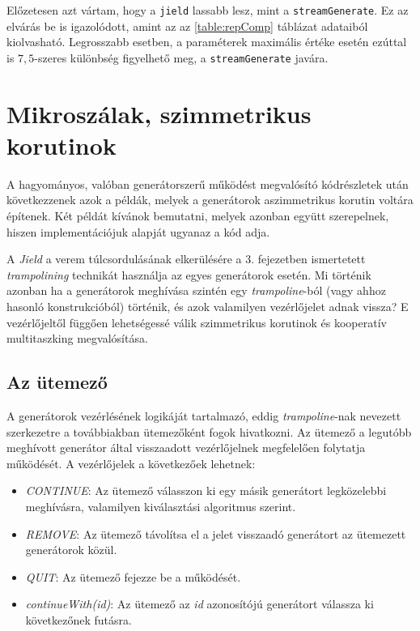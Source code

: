 Előzetesen azt vártam, hogy a \texttt{jield} lassabb lesz, mint a \texttt{streamGenerate}. Ez az elvárás be is igazolódott, amint az az \ref{table:repComp} táblázat adataiból kiolvasható. Legrosszabb esetben, a paraméterek maximális értéke esetén ezúttal is $7,5$-szeres különbség figyelhető meg, a \texttt{streamGenerate} javára. 

\section{Mikroszálak, szimmetrikus korutinok}

A hagyományos, valóban generátorszerű működést megvalósító kódrészletek után következzenek azok a példák, melyek a generátorok aszimmetrikus korutin voltára építenek. Két példát kívánok bemutatni, melyek azonban együtt szerepelnek, hiszen implementációjuk alapját ugyanaz a kód adja. 

A \textit{Jield} a verem túlcsordulásának elkerülésére a 3. fejezetben ismertetett \textit{trampolining} technikát használja az egyes generátorok esetén. Mi történik azonban ha a generátorok meghívása szintén egy \textit{trampoline}-ból (vagy ahhoz hasonló konstrukcióból) történik, és azok valamilyen vezérlőjelet adnak vissza? E vezérlőjeltől függően lehetségessé válik szimmetrikus korutinok és kooperatív multitaszking megvalósítása.

\subsection{Az ütemező}

A generátorok vezérlésének logikáját tartalmazó, eddig \textit{trampoline}-nak nevezett szerkezetre a továbbiakban ütemezőként fogok hivatkozni. Az ütemező a legutóbb meghívott generátor által visszaadott vezérlőjelnek megfelelően folytatja működését. A vezérlőjelek a következőek lehetnek:

\begin{itemize}
  \item \textit{CONTINUE}: Az ütemező válasszon ki egy másik generátort legközelebbi meghívásra, valamilyen kiválasztási algoritmus szerint.
  \item \textit{REMOVE}: Az ütemező távolítsa el a jelet visszaadó generátort az ütemezett generátorok közül.
  \item \textit{QUIT}: Az ütemező fejezze be a működését.
  \item \textit{continueWith(id)}: Az ütemező az \textit{id} azonosítójú generátort válassza ki következőnek futásra.
\end{itemize}

